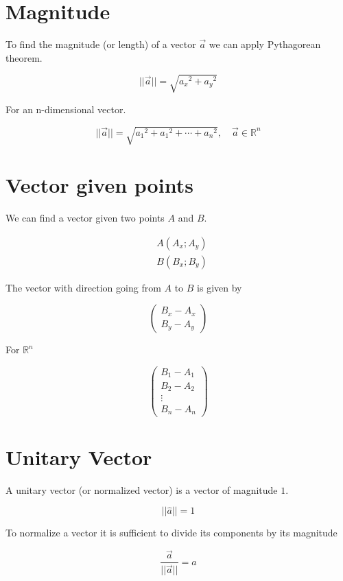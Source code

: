 \documentclass{article}
\begin{document}
\section{Magnitude}

To find the magnitude (or length) of a vector \(\vec{a}\) we can apply Pythagorean theorem.

\[
    ||\vec{a}|| = \sqrt{{a_x}^2 + {a_y}^2}
\]

For an n-dimensional vector.

\[
    ||\vec{a}|| = \sqrt{{a_1}^2 + {a_1}^2 + \cdots + {a_n}^2},
    \quad \vec{a}\in\mathbb{R}^n
\]

\section{Vector given points}

We can find a vector given two points \(A\) and \(B\).

\begin{align*}
    &A(A_x; A_y) \\
    &B(B_x; B_y)
\end{align*}

The vector with direction going from \(A\) to \(B\) is given by

\[
    \begin{pmatrix}
        B_x - A_x \\
        B_y - A_y
    \end{pmatrix}
\]

For \({{\mathbb{R}}^n}\)

\[
    \begin{pmatrix}
        B_1 - A_1 \\
        B_2 - A_2 \\
        \vdots \\
        B_n - A_n
    \end{pmatrix}
\]

\pagebreak

\section{Unitary Vector}

A unitary vector (or normalized vector) is a vector of magnitude \(1\).

\[
    ||\hat{a}|| = 1
\]

To normalize a vector it is sufficient to divide its components by its magnitude

\[
    \frac{\vec{a}}{||\vec{a}||}=\hat{a}
\]
\end{document}
